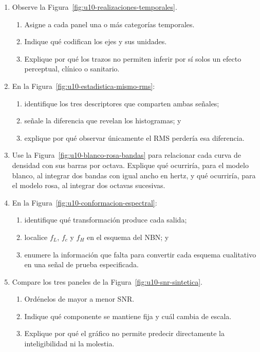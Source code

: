 \begin{enumerate}[label=\textbf{V\arabic*.},leftmargin=*]
    \item Observe la Figura~\ref{fig:u10-realizaciones-temporales}.
    \begin{enumerate}
        \item Asigne a cada panel una o más categorías temporales.
        \item Indique qué codifican los ejes y sus unidades.
        \item Explique por qué los trazos no permiten inferir por sí solos un
        efecto perceptual, clínico o sanitario.
    \end{enumerate}

    \item En la Figura~\ref{fig:u10-estadistica-mismo-rms}:
    \begin{enumerate}
        \item identifique los tres descriptores que comparten ambas señales;
        \item señale la diferencia que revelan los histogramas; y
        \item explique por qué observar únicamente el RMS perdería esa
        diferencia.
    \end{enumerate}

    \item Use la Figura~\ref{fig:u10-blanco-rosa-bandas} para relacionar cada
    curva de densidad con sus barras por octava. Explique qué ocurriría, para
    el modelo blanco, al integrar dos bandas con igual ancho en hertz, y qué
    ocurriría, para el modelo rosa, al integrar dos octavas sucesivas.

    \item En la Figura~\ref{fig:u10-conformacion-espectral}:
    \begin{enumerate}
        \item identifique qué transformación produce cada salida;
        \item localice \(f_L\), \(f_c\) y \(f_H\) en el esquema del NBN; y
        \item enumere la información que falta para convertir cada esquema
        cualitativo en una señal de prueba especificada.
    \end{enumerate}

    \item Compare los tres paneles de la
    Figura~\ref{fig:u10-snr-sintetica}.
    \begin{enumerate}
        \item Ordénelos de mayor a menor SNR.
        \item Indique qué componente se mantiene fija y cuál cambia de escala.
        \item Explique por qué el gráfico no permite predecir directamente la
        inteligibilidad ni la molestia.
    \end{enumerate}


\end{enumerate}

